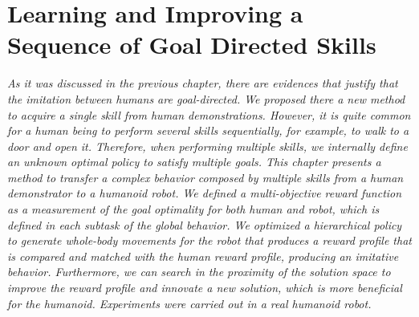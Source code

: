 \chapter{Learning and Improving a Sequence of Goal Directed Skills}\label{ch_multiple_behaviors}
\textit{As it was discussed in the previous chapter, there are evidences that justify that the imitation between humans are goal-directed. We proposed there a new method to acquire a single skill from human demonstrations. However, it is quite common for a human being to perform several skills sequentially, for example, to walk to a door and open it. Therefore, when performing multiple skills, we internally define an unknown optimal policy to satisfy multiple goals. This chapter presents a method to transfer a complex behavior composed by multiple skills  from a human demonstrator to a humanoid robot. We defined a multi-objective reward function as a measurement of the goal optimality for both human and robot, which is defined in each subtask of the global behavior. We optimized a hierarchical policy to generate whole-body movements for the robot that produces a reward profile that is compared and matched with the human reward profile, producing an imitative behavior. Furthermore, we can search in the proximity of the solution space to improve the reward profile and innovate a new solution, which is more beneficial for the humanoid. Experiments were carried out in a real  humanoid robot.}
\newpage
%
%
%
%
%
%
%
%
%
%
%
%
